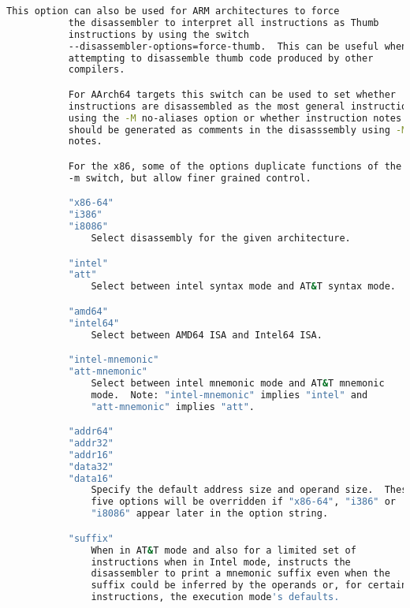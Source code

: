 {{\begin{lstlisting}[language=bash]
           This option can also be used for ARM architectures to force
           the disassembler to interpret all instructions as Thumb
           instructions by using the switch
           --disassembler-options=force-thumb.  This can be useful when
           attempting to disassemble thumb code produced by other
           compilers.

           For AArch64 targets this switch can be used to set whether
           instructions are disassembled as the most general instruction
           using the -M no-aliases option or whether instruction notes
           should be generated as comments in the disasssembly using -M
           notes.

           For the x86, some of the options duplicate functions of the
           -m switch, but allow finer grained control.

           "x86-64"
           "i386"
           "i8086"
               Select disassembly for the given architecture.

           "intel"
           "att"
               Select between intel syntax mode and AT&T syntax mode.

           "amd64"
           "intel64"
               Select between AMD64 ISA and Intel64 ISA.

           "intel-mnemonic"
           "att-mnemonic"
               Select between intel mnemonic mode and AT&T mnemonic
               mode.  Note: "intel-mnemonic" implies "intel" and
               "att-mnemonic" implies "att".

           "addr64"
           "addr32"
           "addr16"
           "data32"
           "data16"
               Specify the default address size and operand size.  These
               five options will be overridden if "x86-64", "i386" or
               "i8086" appear later in the option string.

           "suffix"
               When in AT&T mode and also for a limited set of
               instructions when in Intel mode, instructs the
               disassembler to print a mnemonic suffix even when the
               suffix could be inferred by the operands or, for certain
               instructions, the execution mode's defaults.


\end{lstlisting}}}
